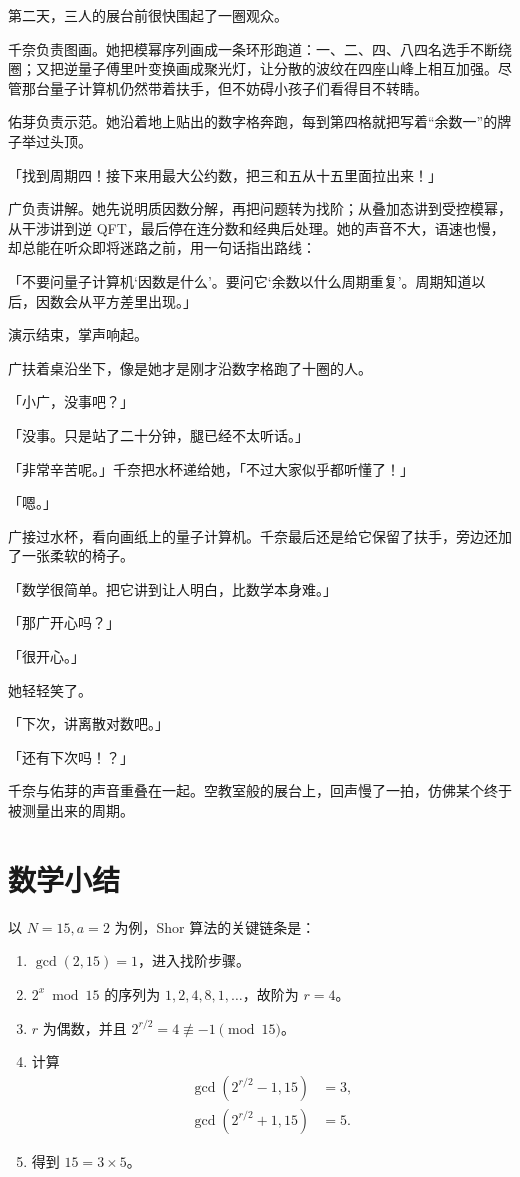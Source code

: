 第二天，三人的展台前很快围起了一圈观众。

千奈负责图画。她把模幂序列画成一条环形跑道：一、二、四、八四名选手不断绕圈；又把逆量子傅里叶变换画成聚光灯，让分散的波纹在四座山峰上相互加强。尽管那台量子计算机仍然带着扶手，但不妨碍小孩子们看得目不转睛。

佑芽负责示范。她沿着地上贴出的数字格奔跑，每到第四格就把写着“余数一”的牌子举过头顶。

「找到周期四！接下来用最大公约数，把三和五从十五里面拉出来！」

广负责讲解。她先说明质因数分解，再把问题转为找阶；从叠加态讲到受控模幂，从干涉讲到逆 QFT，最后停在连分数和经典后处理。她的声音不大，语速也慢，却总能在听众即将迷路之前，用一句话指出路线：

「不要问量子计算机‘因数是什么’。要问它‘余数以什么周期重复’。周期知道以后，因数会从平方差里出现。」

演示结束，掌声响起。

广扶着桌沿坐下，像是她才是刚才沿数字格跑了十圈的人。

「小广，没事吧？」

「没事。只是站了二十分钟，腿已经不太听话。」

「非常辛苦呢。」千奈把水杯递给她，「不过大家似乎都听懂了！」

「嗯。」

广接过水杯，看向画纸上的量子计算机。千奈最后还是给它保留了扶手，旁边还加了一张柔软的椅子。

「数学很简单。把它讲到让人明白，比数学本身难。」

「那广开心吗？」

「很开心。」

她轻轻笑了。

「下次，讲离散对数吧。」

「还有下次吗！？」

千奈与佑芽的声音重叠在一起。空教室般的展台上，回声慢了一拍，仿佛某个终于被测量出来的周期。

\section{数学小结}

以 $N=15,a=2$ 为例，Shor 算法的关键链条是：

\begin{enumerate}[leftmargin=2.4em]
  \item $\gcd(2,15)=1$，进入找阶步骤。
  \item $2^x\bmod15$ 的序列为 $1,2,4,8,1,\ldots$，故阶为 $r=4$。
  \item $r$ 为偶数，并且 $2^{r/2}=4\not\equiv-1\pmod{15}$。
  \item 计算
  \begin{align*}
    \gcd(2^{r/2}-1,15)&=3,\\
    \gcd(2^{r/2}+1,15)&=5.
  \end{align*}
  \item 得到 $15=3\times5$。
\end{enumerate}

